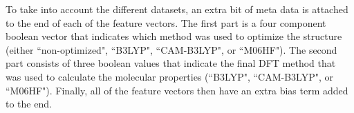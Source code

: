 To take into account the different datasets, an extra bit of meta data is attached to the end of each of the feature vectors. The first part is a four component boolean vector that indicates which method was used to optimize the structure (either ``non-optimized", ``B3LYP", ``CAM-B3LYP", or ``M06HF"). The second part consists of three boolean values that indicate the final DFT method that was used to calculate the molecular properties (``B3LYP", ``CAM-B3LYP", or ``M06HF"). Finally, all of the feature vectors then have an extra bias term added to the end.
